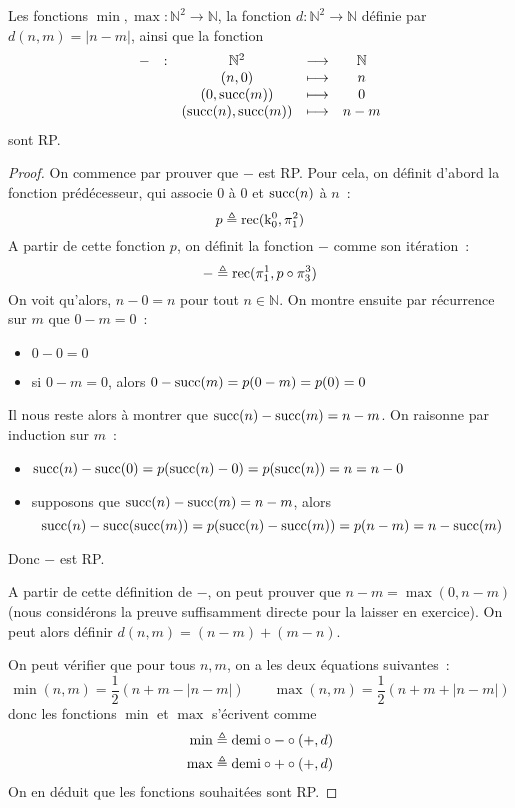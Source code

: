 \begin{proposition}
  Les fonctions $\min,\max : \mathbb N^2 \to \mathbb N$, la fonction
  $d : \mathbb N^2 \to \mathbb N$ définie par $d(n,m) = | n - m |$,
  ainsi que la fonction
  \[\begin{array}{ccccc}
  - &: & \mathbb N^2 &\longrightarrow & \mathbb N\\
  & & (n,0) & \longmapsto & n\\
  & & (0,\operatorname{succ}(m)) &\longmapsto & 0\\
  & & (\operatorname{succ}(n),\operatorname{succ}(m)) &\longmapsto & n - m
  \end{array}\]
  sont RP.
\end{proposition}

\begin{proof}
  On commence par prouver que $-$ est RP. Pour cela, on définit d'abord la
  fonction prédécesseur, qui associe $0$ à $0$ et $\operatorname{succ}(n)$ à $n$~:
  \[p \triangleq \operatorname{rec}(\mathrm k_0^0,\pi_1^2)\]
  A partir de cette fonction $p$, on définit la fonction $-$ comme son
  itération~:
  \[- \triangleq \operatorname{rec}(\pi_1^1,p \circ \pi_3^3)\]
  On voit qu'alors, $n - 0 = n$ pour tout $n \in \mathbb N$. On montre ensuite
  par récurrence sur $m$ que $0 - m = 0$~:
  \begin{itemize}
  \item $0 - 0 = 0$
  \item si $0 - m = 0$, alors $0 - \operatorname{succ}(m) = p(0-m) = p(0) = 0$
  \end{itemize}
  Il nous reste alors à montrer que $\operatorname{succ}(n) - \operatorname{succ}(m) = n - m$. On raisonne
  par induction sur $m$~:
  \begin{itemize}
  \item $\operatorname{succ}(n) - \operatorname{succ}(0) = p(\operatorname{succ}(n) - 0) = p(\operatorname{succ}(n)) = n = n - 0$
  \item supposons que $\operatorname{succ}(n) - \operatorname{succ}(m) = n - m$, alors
    \[
    \operatorname{succ}(n) - \operatorname{succ}(\operatorname{succ}(m)) = p(\operatorname{succ}(n) - \operatorname{succ}(m)) = p(n - m)
    = n - \operatorname{succ}(m)
    \]
  \end{itemize}
  Donc $-$ est RP.

  A partir de cette définition de $-$, on peut prouver que $n-m = \max(0,n-m)$
  (nous considérons la preuve suffisamment directe pour la laisser en
  exercice). On peut alors définir $d(n,m) = (n - m) + (m - n)$.

  On peut vérifier que pour tous $n,m$, on a les deux équations suivantes~:
  \[\min(n,m) = \frac{1}{2}(n + m - |n - m|)\qquad
  \max(n,m) = \frac{1}{2}(n + m + |n - m|)\]
  donc les fonctions $\min$ et $\max$ s'écrivent comme
  \begin{align*}
    \min &\triangleq \mathrm{demi}\circ - \circ (+,d)\\
    \max &\triangleq \mathrm{demi}\circ + \circ (+,d)
  \end{align*}
  On en déduit que les fonctions souhaitées sont RP.
\end{proof}

